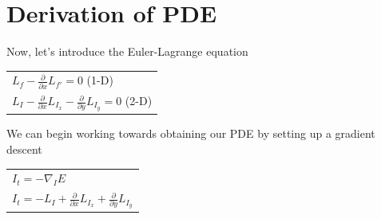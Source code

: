 \documentclass{article}
\begin{document}
  \noindent


    

  \newpage
  \section{Derivation of PDE}

    \noindent Now, let's introduce the Euler-Lagrange equation
      \begin{center}
        \begin{tabular}{l}
          $L_{f} - \frac{\partial}{\partial x}L_{f'} = 0$ (1-D)\\
          $L_{I} - \frac{\partial}{\partial x}L_{I_{x}} - \frac{\partial}{\partial y}L_{I_{y}} = 0$ (2-D)\\
        \end{tabular}
      \end{center}
    \vspace{12pt}

    \noindent
    We can begin working towards obtaining our PDE by setting up a gradient descent
      \begin{center}
        \begin{tabular}{l}
          $I_{t} = -\nabla_{I}E$\\
          $I_{t} = -L_{I} + \frac{\partial}{\partial x}L_{I_{x}} + \frac{\partial}{\partial y}L_{I_{y}}$
        \end{tabular}
      \end{center}
    \vspace{12pt}
\end{document}
